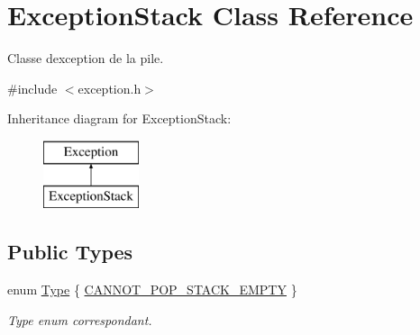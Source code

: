 \hypertarget{class_exception_stack}{}\section{Exception\+Stack Class Reference}
\label{class_exception_stack}


Classe d\textquotesingle{}exception de la pile.  




{\ttfamily \#include $<$exception.\+h$>$}

Inheritance diagram for Exception\+Stack\+:\begin{figure}[H]
\begin{center}
\leavevmode
\includegraphics[height=2.000000cm]{class_exception_stack}
\end{center}
\end{figure}
\subsection*{Public Types}
\begin{DoxyCompactItemize}
\item 
enum \hyperlink{class_exception_stack_a79d7356c90bf8e48387a32723e7fe298}{Type} \{ \hyperlink{class_exception_stack_a79d7356c90bf8e48387a32723e7fe298a44e3e60c8f4046deae4da88e3d02493f}{C\+A\+N\+N\+O\+T\+\_\+\+P\+O\+P\+\_\+\+S\+T\+A\+C\+K\+\_\+\+E\+M\+P\+TY}
 \}\begin{DoxyCompactList}\small\item\em Type enum correspondant. \end{DoxyCompactList}
\end{DoxyCompactItemize}
